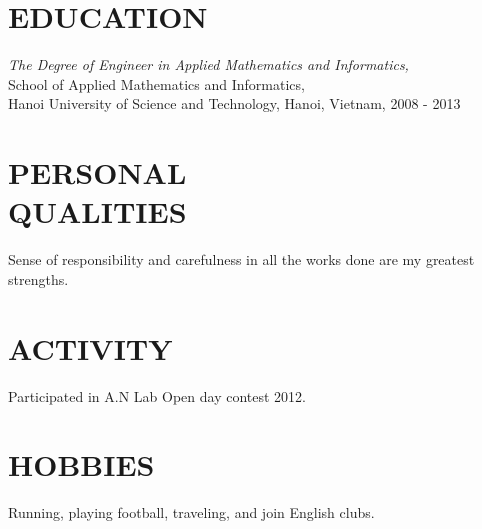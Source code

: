 \documentclass[margin, 10pt]{res}
\begin{document}
\begin{resume}
\section{EDUCATION}
   {\sl The Degree of Engineer in Applied Mathematics and Informatics,}\\
   School of Applied Mathematics and Informatics, \\
   Hanoi University of Science and Technology, Hanoi, Vietnam, 2008 - 2013 \\
	
\section{PERSONAL \\ QUALITIES} Sense of responsibility and carefulness in all the works done are my greatest strengths.\\
 
\section{ACTIVITY} Participated in A.N Lab Open day contest 2012.

\section{HOBBIES} Running, playing football, traveling, and join English clubs.

\end{resume}
\end{document}
